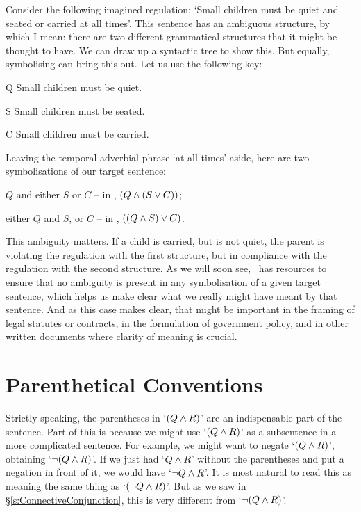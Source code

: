 Consider the following imagined regulation: `Small children must be quiet and seated or carried at all times'. This sentence has an ambiguous structure, by which I mean: there are two different grammatical structures that it might be thought to have. We can draw up a syntactic tree to show this. But equally, symbolising can bring this out. Let us use the following key:
\begin{ekey}
	\item[Q] Small children must be quiet.
	\item[S] Small children must be seated.
	\item[C] Small children must be carried.
\end{ekey}
Leaving the temporal adverbial phrase `at all times' aside, here are two symbolisations of our target sentence:\begin{earg}
	\item[] $Q$ \textsf{and} \textsf{either} $S$ \textsf{or} $C$ – in \TFL, $(Q \wedge (S \vee C))$;
	\item[] \textsf{either} $Q$ \textsf{and}  $S$, \textsf{or} $C$ – in \TFL, $((Q \wedge S) \vee C)$.
\end{earg}
This ambiguity matters. If a child is carried, but is not quiet, the parent is violating the regulation with the first structure, but in compliance with the regulation with the second structure. As we will soon see, \TFL\ has resources to ensure that no ambiguity is present in any symbolisation of a given target sentence, which helps us make clear what we really might have meant by that sentence. And as this case makes clear, that might be important in the framing of legal statutes or contracts, in the formulation of government policy, and in other written documents where clarity of meaning is crucial.

\section{Parenthetical Conventions}
\label{TFLconventions}
Strictly speaking, the parentheses in `$(Q \wedge R)$' are an indispensable part of the sentence. Part of this is because we might use `$(Q \wedge R)$' as a subsentence in a more complicated sentence. For example, we might want to negate `$(Q \wedge R)$', obtaining `$\neg(Q \wedge R)$'. If we just had `$Q \wedge R$' without the parentheses and put a negation in front of it, we would have `$\neg Q \wedge R$'. It is most natural to read this as meaning the same thing as `$(\neg Q \wedge R)$'. But as we saw in  §\ref{s:ConnectiveConjunction}, this is very different from `$\neg(Q\wedge R)$'.

